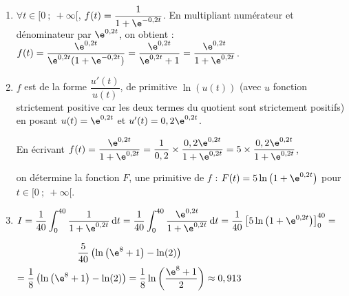 \begin{enumerate}
	\item $\forall t \in [0~;~+\infty[$, $f(t) = \dfrac{1}{1+ \e^{-0,2t}}$. En multipliant numérateur et dénominateur par $\e^{0,2t}$, on obtient : $f(t)=\dfrac{\e^{0,2t}}{\e^{0,2t}(1+ \e^{-0,2t})}= \dfrac{\e^{0,2t}}{\e^{0,2t} + 1} = \dfrac{\e^{0,2t}}{1 + \e^{0,2t}}$.
	\item $f$ est de la forme $\dfrac{u'(t)}{u(t)}$, de primitive $\ln(u(t))$ (avec $u$ fonction strictement positive car les deux termes du quotient sont strictement positifs) en posant $u(t)=\e^{0,2t}$ et $u'(t)= 0,2\e^{0,2t}$.

En écrivant $f(t)=\dfrac{\e^{0,2t}}{1 + \e^{0,2t}}=\dfrac{1}{0,2}\times \dfrac{0,2\e^{0,2t}}{1 + \e^{0,2t}}=5\times \dfrac{0,2\e^{0,2t}}{1 + \e^{0,2t}}$,

on détermine la fonction $F$, une primitive de $f$ : $F(t)= 5\ln\left(1 + \e^{0,2t}\right)$ pour $t \in [0~;~+\infty[$.
	\item $I = \dfrac{1}{40}\displaystyle\int_0^{40} \dfrac{1}{1 + \e^{0,2t}}\,\text{d}t = \dfrac{1}{40}\displaystyle\int_0^{40} \dfrac{\e^{0,2t}}{1 + \e^{0,2t}} \,\text{d}t =\dfrac{1}{40}\left[5\ln\left(1 + \e^{0,2t}\right)\right]_0^{40}=$

$\begin{gathered}\dfrac{5}{40}\left(\ln\left(\e^8+1\right)-\ln(2)\right)\\=\dfrac{1}{8}\left(\ln\left(\e^8+1\right)-\ln(2)\right)=\dfrac{1}{8} \ln\left(\dfrac{\e^8+1}{2}\right)\approx 0,913\end{gathered}$
\end{enumerate}
